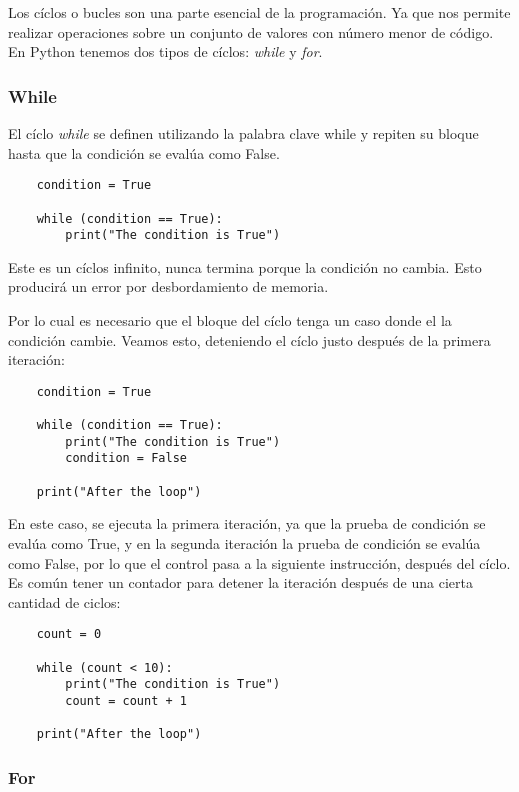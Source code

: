 \documentclass[12pt]{article}
\begin{document}
    Los cíclos o bucles son una parte esencial de la programación.
    Ya que nos permite realizar operaciones sobre un conjunto de valores con número menor de código.
    En Python tenemos dos tipos de cíclos: \textit{while} y \textit{for}.

    \subsubsection{While}
    El cíclo \textit{while} se definen utilizando la palabra clave while y repiten su bloque hasta que la condición se evalúa como False.

    \begin{lstlisting}
    condition = True

    while (condition == True):
        print("The condition is True")
    \end{lstlisting}

    Este es un cíclos infinito, nunca termina porque la condición no cambia.
    Esto producirá un error por desbordamiento de memoria.

    Por lo cual es necesario que el bloque del cíclo tenga un caso donde el la condición cambie.
    Veamos esto, deteniendo el cíclo justo después de la primera iteración:
    \begin{lstlisting}
    condition = True

    while (condition == True):
        print("The condition is True")
        condition = False

    print("After the loop")
    \end{lstlisting}

    En este caso, se ejecuta la primera iteración, ya que la prueba de condición se evalúa como True, y en la segunda
    iteración la prueba de condición se evalúa como False, por lo que el control pasa a la siguiente instrucción,
    después del cíclo.
    Es común tener un contador para detener la iteración después de una cierta cantidad de ciclos:

    \begin{lstlisting}
    count = 0

    while (count < 10):
        print("The condition is True")
        count = count + 1

    print("After the loop")
    \end{lstlisting}

    \subsubsection{For}
\end{document}
